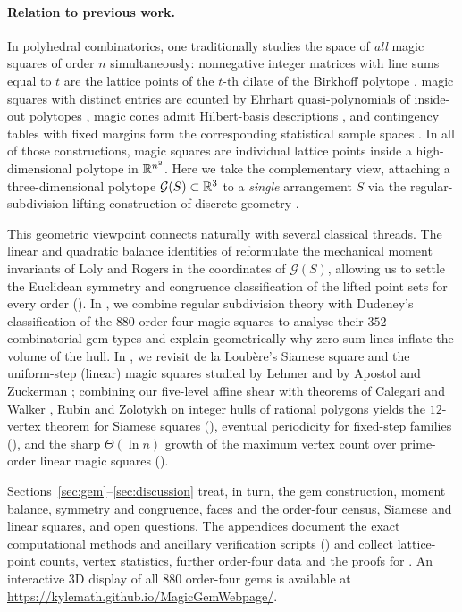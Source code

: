 \paragraph{Relation to previous work.}
In polyhedral combinatorics, one traditionally studies the space of \emph{all} magic squares of order $n$ simultaneously: nonnegative integer matrices with line sums equal to $t$ are the lattice points of the $t$-th dilate of the Birkhoff polytope \cite{stanley1973magic,ehrhart1973magic,ziegler1995lectures}, magic squares with distinct entries are counted by Ehrhart quasi-polynomials of inside-out polytopes \cite{beck2006insideout,beck2010enumeration}, magic cones admit Hilbert-basis descriptions \cite{ahmed2003polyhedral}, and contingency tables with fixed margins form the corresponding statistical sample spaces \cite{diaconis1995rectangular}.
In all of those constructions, magic squares are individual lattice points inside a high-dimensional polytope in $\mathbb{R}^{n^2}$. Here we take the complementary view, attaching a three-dimensional polytope $\mathcal G(S)\subset\mathbb{R}^3$ to a \emph{single} arrangement $S$ via the regular-subdivision lifting construction of discrete geometry \cite{gelfand1994discriminants,deloera2010triangulations}.

This geometric viewpoint connects naturally with several classical threads. The linear and quadratic balance identities of  reformulate the mechanical moment invariants of Loly and Rogers \cite{loly2004invariance,rogers2004inertia,rogers2005multipole} in the coordinates of $\mathcal G(S)$, allowing us to settle the Euclidean symmetry and congruence classification of the lifted point sets for every order (). In , we combine regular subdivision theory with Dudeney's classification of the $880$ order-four magic squares \cite{dudeney1917amusements} to analyse their $352$ combinatorial gem types and explain geometrically why zero-sum lines inflate the volume of the hull. In , we revisit de la Loub\`ere's Siamese square \cite{loubere1693} and the uniform-step (linear) magic squares studied by Lehmer \cite{lehmer1929} and by Apostol and Zuckerman \cite{apostol1951}; combining our five-level affine shear with theorems of Calegari and Walker \cite{calegari2013integer}, Rubin \cite{rubin1970} and Zolotykh \cite{zolotykh2006vertices} on integer hulls of rational polygons yields the $12$-vertex theorem for Siamese squares (), eventual periodicity for fixed-step families (), and the sharp $\Theta(\ln n)$ growth of the maximum vertex count over prime-order linear magic squares ().

Sections~\ref{sec:gem}--\ref{sec:discussion} treat, in turn, the gem construction, moment balance, symmetry and congruence, faces and the order-four census, Siamese and linear squares, and open questions. The appendices document the exact computational methods and ancillary verification scripts () and collect lattice-point counts, vertex statistics, further order-four data and the proofs for .
An interactive 3D display of all $880$ order-four gems is available at \url{https://kylemath.github.io/MagicGemWebpage/}.
